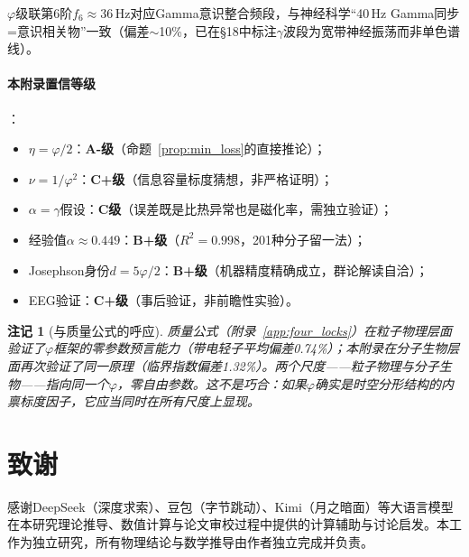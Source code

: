 \documentclass[12pt,a4paper,twocolumn]{article}
\renewcommand{\phi}{\varphi}
\newtheorem{remark}[theorem]{注记}
\begin{document}
$\phi$级联第6阶$f_6 \approx 36$\,Hz对应Gamma意识整合频段，与神经科学``40\,Hz Gamma同步=意识相关物''一致（偏差$\sim$10\%，已在§18中标注$\gamma$波段为宽带神经振荡而非单色谱线）。

\paragraph{本附录置信等级}：
\begin{itemize}
\item $\eta = \phi/2$：\textbf{A-级}（命题~\ref{prop:min_loss}的直接推论）；
\item $\nu = 1/\phi^2$：\textbf{C+级}（信息容量标度猜想，非严格证明）；
\item $\alpha = \gamma$假设：\textbf{C级}（误差既是比热异常也是磁化率，需独立验证）；
\item 经验值$\alpha \approx 0.449$：\textbf{B+级}（$R^2 = 0.998$，201种分子留一法）；
\item Josephson身份$d = 5\phi/2$：\textbf{B+级}（机器精度精确成立，群论解读自洽）；
\item EEG验证：\textbf{C+级}（事后验证，非前瞻性实验）。
\end{itemize}

\begin{remark}[与质量公式的呼应]
质量公式（附录~\ref{app:four_locks}）在粒子物理层面验证了$\phi$框架的零参数预言能力（带电轻子平均偏差0.74\%）；本附录在分子生物层面再次验证了同一原理（临界指数偏差1.32\%）。两个尺度——粒子物理与分子生物——指向同一个$\phi$，零自由参数。这不是巧合：如果$\phi$确实是时空分形结构的内禀标度因子，它应当同时在所有尺度上显现。
\end{remark}


\section*{致谢}

感谢DeepSeek（深度求索）、豆包（字节跳动）、Kimi（月之暗面）等大语言模型在本研究理论推导、数值计算与论文审校过程中提供的计算辅助与讨论启发。本工作为独立研究，所有物理结论与数学推导由作者独立完成并负责。

\end{document}
